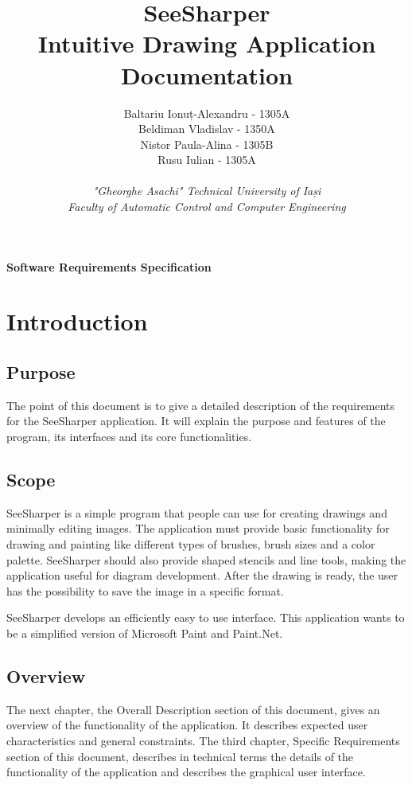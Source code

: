 \documentclass[12pt]{article}
\title
{
	\textbf
	{
		SeeSharper
		\\
		Intuitive Drawing Application
		\\
		Documentation
	}
}
\author
{
	Baltariu Ionuț-Alexandru - 1305A
	\\
	Beldiman Vladislav - 1350A
	\\
	Nistor Paula-Alina - 1305B
	\\
	Rusu Iulian - 1305A
	\\
	\\
	\textit{"Gheorghe Asachi" Technical University of Iași}
	\\
	\textit{Faculty of Automatic Control and Computer Engineering}
}
\date{}
\begin{document}
\maketitle 

\newpage

\clearpage
\vspace*{\fill}
\begin{center}
{\huge \textbf{Software Requirements Specification}}
\end{center}
\vfill 
\clearpage

\newpage
\tableofcontents
\newpage

\section{Introduction}
\subsection{Purpose}
The point of this document is to give a detailed description of the requirements for the SeeSharper application.
It will explain the purpose and features of the program, its interfaces and its core functionalities.

\subsection{Scope}
SeeSharper is a simple program that people can use for creating drawings and minimally editing images. The application must provide basic functionality for drawing and painting like different types of brushes, brush sizes and a color palette. 
SeeSharper should also provide shaped stencils and line tools, making the application useful for diagram development. After the drawing is ready, the user has the possibility to save the image in a specific format.

SeeSharper develops an efficiently easy to use interface. This application wants to be a simplified version of Microsoft Paint and Paint.Net.

\subsection{Overview}
The next chapter, the Overall Description section of this document, gives an overview of the functionality of the application. It describes expected user characteristics and general constraints. The third chapter, Specific Requirements section of this document, describes in technical terms the details of the functionality of the application and describes the graphical  user  interface.	
\end{document}
